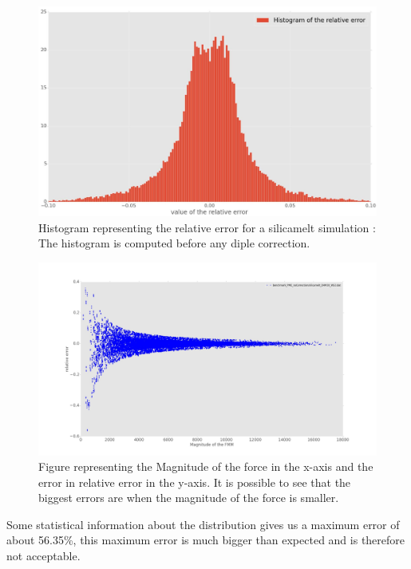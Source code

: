\documentclass[11pt,twoside,a4paper]{report}
\begin{document}
\begin{figure}[H]
  \label{hist_correction} 
   \includegraphics[scale=0.25]{hist_nocorrection.jpeg}
   
    \centering 
    \caption{Histogram representing the relative error for a silicamelt simulation : The histogram is computed before any diple correction.}   
  
   \end{figure}   


	\begin{figure}[H]
	   \includegraphics[scale=0.2]{magErr_noCorrection.jpeg}
    \centering 
    \caption{Figure representing the Magnitude of the force in the x-axis and the  error in relative error in the y-axis. It is possible to see that the biggest errors are when the magnitude of the force is smaller.}    
   \end{figure}  


	Some statistical information about the distribution gives us a maximum error of about 56.35\%, this maximum error is much bigger than expected and is therefore not acceptable.\\
	
\end{document}
